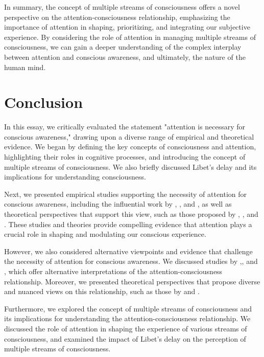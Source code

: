 \documentclass[10pt]{article}
\begin{document}
\begin{sloppypar}
  In summary, the concept of multiple streams of consciousness offers a novel perspective on the attention-consciousness relationship, emphasizing the importance of attention in shaping, prioritizing, and integrating our subjective experience. By considering the role of attention in managing multiple streams of consciousness, we can gain a deeper understanding of the complex interplay between attention and conscious awareness, and ultimately, the nature of the human mind.

  \section{Conclusion}
  \label{sec:conclusion}

  In this essay, we critically evaluated the statement "attention is necessary for conscious awareness," drawing upon a diverse range of empirical and theoretical evidence. We began by defining the key concepts of consciousness and attention, highlighting their roles in cognitive processes, and introducing the concept of multiple streams of consciousness. We also briefly discussed Libet’s delay and its implications for understanding consciousness.

  Next, we presented empirical studies supporting the necessity of attention for conscious awareness, including the influential work by \cite{cohen_attentional_2012}, \cite{kentridge_spatial_2004}, and \cite{sumner_attentional_2006}, as well as theoretical perspectives that support this view, such as those proposed by \cite{baars_essential_1997}, \cite{de_brigard_role_2012}, and \cite{dijksterhuis_goals_2010}. These studies and theories provide compelling evidence that attention plays a crucial role in shaping and modulating our conscious experience.

  However, we also considered alternative viewpoints and evidence that challenge the necessity of attention for conscious awareness. We discussed studies by \cite{aru_phenomenal_2013},\cite{kentridge_attended_2008}, and \cite{kozuch_gorillas_2019}, which offer alternative interpretations of the attention-consciousness relationship. Moreover, we presented theoretical perspectives that propose diverse and nuanced views on this relationship, such as those by \cite{montemayor_types_2021} and \cite{noah_recent_2020}.

  Furthermore, we explored the concept of multiple streams of consciousness and its implications for understanding the attention-consciousness relationship. We discussed the role of attention in shaping the experience of various streams of consciousness, and examined the impact of Libet’s delay on the perception of multiple streams of consciousness.


\end{sloppypar}
\end{document}
